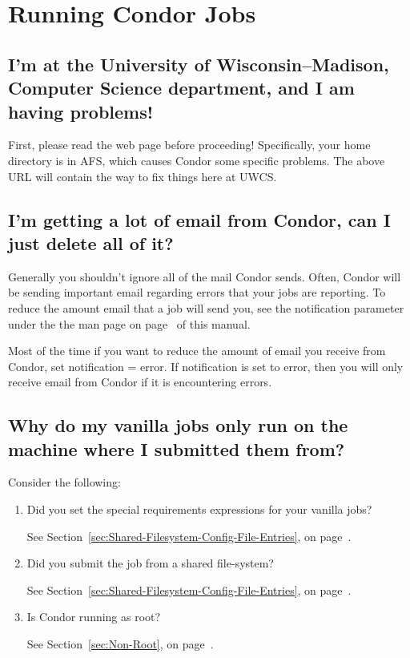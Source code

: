 \Todo



\section{Running Condor Jobs}


\subsection{I'm at the University of Wisconsin--Madison, Computer Science department, and I am having problems!}

First, please read the web page  before proceeding!
Specifically, your home directory is in AFS, which causes Condor some specific problems.
The above URL will contain the way to fix things here at UWCS.

\subsection{I'm getting a lot of email from Condor, can I just delete all of it?}

Generally you shouldn't ignore all of the mail Condor sends.  Often,
Condor will be sending important email regarding errors that your
jobs are reporting.  To reduce the amount email that a job will send
you, see the notification parameter under the the  man page
on page~\pageref{man-condor-submit-notification} of this manual.

Most of the time if you want to reduce the amount of email you receive
from Condor, set notification = error.  If notification is set to
error, then you will only receive email from Condor if it is encountering
errors.

\subsection{Why do my vanilla jobs only run on the machine where I submitted them from?}
Consider the following:
\begin {enumerate}
\item{Did you set the special requirements expressions for
your vanilla jobs?}

See Section~\ref{sec:Shared-Filesystem-Config-File-Entries}, on page~\pageref{sec:Shared-Filesystem-Config-File-Entries}.

\item{Did you submit the job from a shared file-system?}

See Section~\ref{sec:Shared-Filesystem-Config-File-Entries}, on page~\pageref{sec:Shared-Filesystem-Config-File-Entries}.

\item{Is Condor running as root?}

See Section~\ref{sec:Non-Root}, on page~\pageref{sec:Non-Root}.

\end{enumerate}
